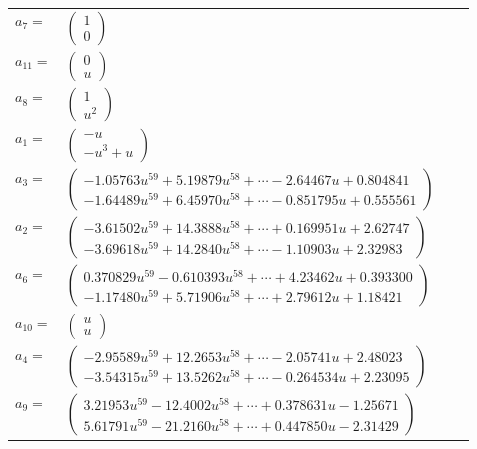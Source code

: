 \documentclass[1p]{elsarticle_modified}
\theoremstyle{definition}
\begin{document}
\begin{tabular}{m{7pt} m{180pt} m{7pt} m{180pt} }
\flushright $a_{7}=$&$\begin{pmatrix}1\\0\end{pmatrix}$ \\
\flushright $a_{11}=$&$\begin{pmatrix}0\\u\end{pmatrix}$ \\
\flushright $a_{8}=$&$\begin{pmatrix}1\\u^2\end{pmatrix}$ \\
\flushright $a_{1}=$&$\begin{pmatrix}- u\\- u^3+u\end{pmatrix}$ \\
\flushright $a_{3}=$&$\begin{pmatrix}-1.05763 u^{59}+5.19879 u^{58}+\cdots-2.64467 u+0.804841\\-1.64489 u^{59}+6.45970 u^{58}+\cdots-0.851795 u+0.555561\end{pmatrix}$ \\
\flushright $a_{2}=$&$\begin{pmatrix}-3.61502 u^{59}+14.3888 u^{58}+\cdots+0.169951 u+2.62747\\-3.69618 u^{59}+14.2840 u^{58}+\cdots-1.10903 u+2.32983\end{pmatrix}$ \\
\flushright $a_{6}=$&$\begin{pmatrix}0.370829 u^{59}-0.610393 u^{58}+\cdots+4.23462 u+0.393300\\-1.17480 u^{59}+5.71906 u^{58}+\cdots+2.79612 u+1.18421\end{pmatrix}$ \\
\flushright $a_{10}=$&$\begin{pmatrix}u\\u\end{pmatrix}$ \\
\flushright $a_{4}=$&$\begin{pmatrix}-2.95589 u^{59}+12.2653 u^{58}+\cdots-2.05741 u+2.48023\\-3.54315 u^{59}+13.5262 u^{58}+\cdots-0.264534 u+2.23095\end{pmatrix}$ \\
\flushright $a_{9}=$&$\begin{pmatrix}3.21953 u^{59}-12.4002 u^{58}+\cdots+0.378631 u-1.25671\\5.61791 u^{59}-21.2160 u^{58}+\cdots+0.447850 u-2.31429\end{pmatrix}$ \\

\end{tabular}
\end{document}
